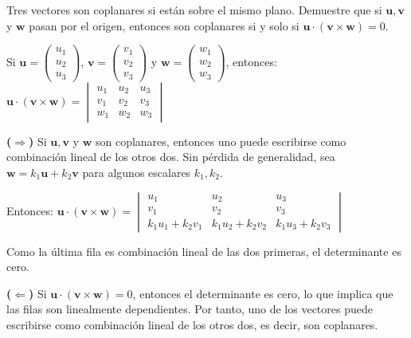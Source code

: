 \begin{prob} Tres vectores son coplanares si están sobre el mismo plano. Demuestre que si $\mathbf{u}, \mathbf{v}$ y $\mathbf{w}$ pasan por el origen, entonces son coplanares si y solo si $\mathbf{u} \cdot (\mathbf{v} \times \mathbf{w}) = 0$.

\begin{myproof}

Si $\mathbf{u}=\begin{pmatrix} u_1\\u_2\\u_3\end{pmatrix}$, $\mathbf{v}=\begin{pmatrix} v_1\\v_2\\v_3\end{pmatrix}$ y $\mathbf{w}=\begin{pmatrix} w_1\\w_2\\w_3\end{pmatrix}$, entonces: $\mathbf{u} \cdot (\mathbf{v} \times \mathbf{w})=\begin{vmatrix} u_1&u_2&u_3\\v_1&v_2&v_3\\w_1&w_2&w_3 \end{vmatrix}$

\textbf{($\Rightarrow$)} Si $\mathbf{u}, \mathbf{v}$ y $\mathbf{w}$ son coplanares, entonces uno puede escribirse como combinación lineal de los otros dos. Sin pérdida de generalidad, sea $\mathbf{w}=k_1\mathbf{u}+k_2\mathbf{v}$ para algunos escalares $k_1, k_2$.

Entonces: $\mathbf{u} \cdot (\mathbf{v} \times \mathbf{w})=\begin{vmatrix}
u_1 & u_2 & u_3 \\
v_1 & v_2 & v_3 \\
k_1u_1+k_2v_1 & k_1u_2+k_2v_2 & k_1u_3+k_2v_3
\end{vmatrix}$

Como la última fila es combinación lineal de las dos primeras, el determinante es cero.

\textbf{($\Leftarrow$)} Si $\mathbf{u} \cdot (\mathbf{v} \times \mathbf{w}) = 0$, entonces el determinante es cero, lo que implica que las filas son linealmente dependientes. Por tanto, uno de los vectores puede escribirse como combinación lineal de los otros dos, es decir, son coplanares.

\end{myproof}	
\end{prob}

